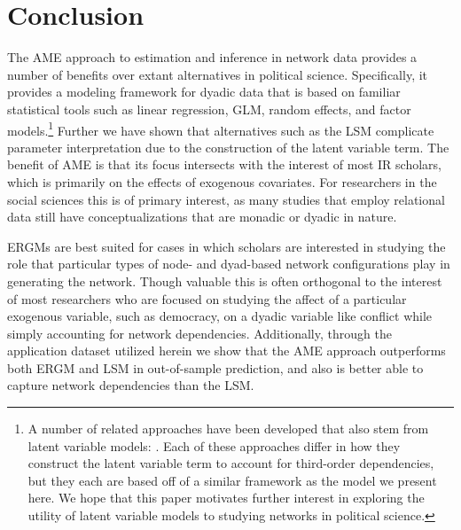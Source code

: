 \documentclass[12pt,pdflatex]{elsarticle}
\begin{document}
\section*{\textbf{Conclusion}}

The AME approach to estimation and inference in network data provides a number of benefits over extant alternatives in political science. Specifically, it provides a modeling framework for dyadic data that is based on familiar statistical tools such as linear regression, GLM, random effects, and factor models.\footnote{A number of related approaches have been developed that also stem from latent variable models: \citet{sewell:chen:2015,gollini:murphy:2016,durante:etal:2017,kao:etal:2018}. Each of these approaches differ in how they construct the latent variable term to account for third-order dependencies, but they each are based off of a similar framework as the model we present here. We hope that this paper motivates further interest in exploring the utility of latent variable models to studying networks in political science.} Further we have shown that alternatives such as the LSM complicate parameter interpretation due to the construction of the latent variable term. The benefit of AME is that its focus intersects with the interest of most IR scholars, which is primarily on the effects of exogenous covariates. For researchers in the social sciences this is of primary interest, as many studies that employ relational data still have conceptualizations that are monadic or dyadic in nature.

ERGMs are best suited for cases in which scholars are interested in studying the role that particular types of node- and dyad-based network configurations play in generating the network. Though valuable this is often orthogonal to the interest of most researchers who are focused on studying the affect of a particular exogenous variable, such as democracy, on a dyadic variable like conflict while simply accounting for network dependencies. Additionally, through the application dataset utilized herein we show that the AME approach outperforms both ERGM and LSM in out-of-sample prediction, and also is better able to capture network dependencies than the LSM.
\end{document}

